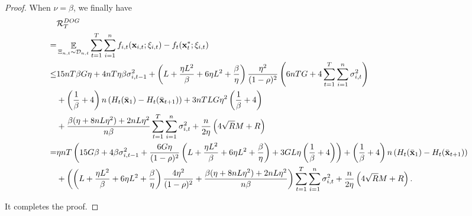 \documentclass{article}
\begin{document}
\begin{proof}
When $\nu = \beta$, we finally have 
\begin{align}
\nonumber
& {\mathcal{R}}_T^{DOG} \\ \nonumber 
= & \mathop{\mathbb{E}}_{ \Xi_{n,t} \sim \mathcal{D}_{n,t} } \sum_{t=1}^T\sum_{i=1}^n f_{i,t}({\bf x}_{i,t};\xi_{i,t}) - f_t({\bf x}_t^\ast;\xi_{i,t}) \\ \nonumber
\le & 15 nT\beta G \eta + 4nT\eta \beta\sigma_{i,t-1}^2 + \left(  L + \frac{\eta L^2}{\beta}  + 6\eta L^2  + \frac{\beta}{\eta}  \right) \frac{\eta^2}{(1-\rho)^2}   \left(  6nTG + 4\sum_{t=1}^T\sum_{i=1}^n \sigma_{i,t}^2  \right) \\ \nonumber 
&+ \left( \frac{1}{\beta} + 4 \right)n\left( H_t(\bar{{\bf x}}_1) - H_t(\bar{{\bf x}}_{t+1}) \right)  + 3nTLG\eta^2\left(  \frac{1}{\beta} + 4  \right) \\ \nonumber 
& + \frac{\beta(\eta + 8nL\eta^2) + 2nL\eta^2}{n\beta} \sum_{t=1}^T\sum_{i=1}^n\sigma_{i,t}^2  + \frac{n}{2\eta}\left(  4\sqrt{R}M + R   \right) \\ \nonumber
= &  \eta nT\left(  15G\beta + 4\beta\sigma_{i,t-1}^2 + \frac{6G\eta}{(1-\rho)^2}\left(  L + \frac{\eta L^2}{\beta} + 6\eta L^2 + \frac{\beta}{\eta}  \right) + 3GL\eta\left( \frac{1}{\beta} + 4 \right)   \right) + \left( \frac{1}{\beta}+4 \right)n \left( H_t(\bar{{\bf x}}_1) - H_t(\bar{{\bf x}}_{t+1}) \right) \\ \nonumber
& + \left(  \left(  L + \frac{\eta L^2}{\beta}  + 6\eta L^2  + \frac{\beta}{\eta}  \right) \frac{4\eta^2}{(1-\rho)^2} + \frac{\beta(\eta + 8nL\eta^2) + 2nL\eta^2}{n\beta}  \right) \sum_{t=1}^T\sum_{i=1}^n \sigma_{i,t}^2 + \frac{n}{2\eta}\left(  4\sqrt{R}M + R   \right).
\end{align} 

It completes the proof.









\end{proof}
\end{document}
